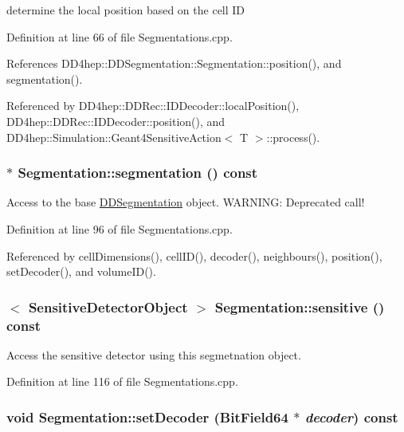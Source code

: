 determine the local position based on the cell ID 

Definition at line 66 of file Segmentations.cpp.

References DD4hep::DDSegmentation::Segmentation::position(), and segmentation().

Referenced by DD4hep::DDRec::IDDecoder::localPosition(), DD4hep::DDRec::IDDecoder::position(), and DD4hep::Simulation::Geant4SensitiveAction$<$ T $>$::process().\hypertarget{class_d_d4hep_1_1_geometry_1_1_segmentation_a5b1895bb731ecc90cfae04294b097a38}{
\subsubsection[{segmentation}]{ $\ast$ Segmentation::segmentation () const}}
\label{class_d_d4hep_1_1_geometry_1_1_segmentation_a5b1895bb731ecc90cfae04294b097a38}


Access to the base \hyperlink{namespace_d_d4hep_1_1_d_d_segmentation}{DDSegmentation} object. WARNING: Deprecated call! 

Definition at line 96 of file Segmentations.cpp.

Referenced by cellDimensions(), cellID(), decoder(), neighbours(), position(), setDecoder(), and volumeID().\hypertarget{class_d_d4hep_1_1_geometry_1_1_segmentation_a17d311aaf6a17fe6f07d9239eee97be2}{
\subsubsection[{sensitive}]{$<$ {\bf SensitiveDetectorObject} $>$ Segmentation::sensitive () const}}
\label{class_d_d4hep_1_1_geometry_1_1_segmentation_a17d311aaf6a17fe6f07d9239eee97be2}


Access the sensitive detector using this segmetnation object. 

Definition at line 116 of file Segmentations.cpp.\hypertarget{class_d_d4hep_1_1_geometry_1_1_segmentation_a618226ff887a018f8176a0d232882580}{
\subsubsection[{setDecoder}]{\setlength{\rightskip}{0pt plus 5cm}void Segmentation::setDecoder (BitField64 $\ast$ {\em decoder}) const}}
\label{class_d_d4hep_1_1_geometry_1_1_segmentation_a618226ff887a018f8176a0d232882580}


